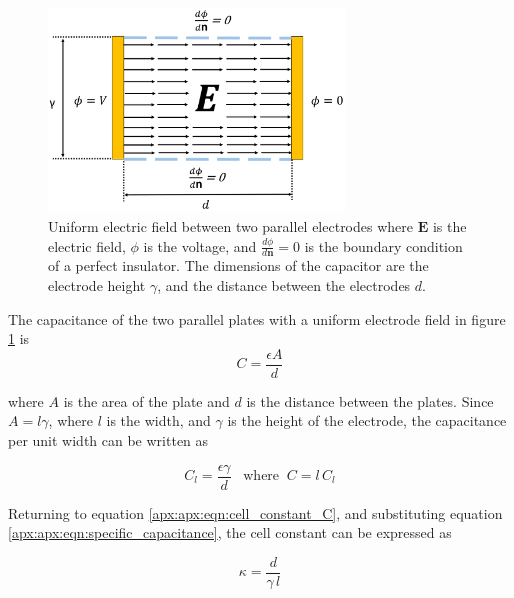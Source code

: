    \begin{figure}[ht]
  \centering
  \includegraphics[width=0.7\textwidth]{images/capacitorNoFringe.png}
  \caption[Uniform electric field between parallel plates]{Uniform electric field between two parallel electrodes where $\boldsymbol{E}$ is the electric field, $\phi$ is the voltage, and $\frac{d\phi}{d\boldsymbol{n}}=0$ is the boundary condition of a perfect insulator. The dimensions of the capacitor are the electrode height $\gamma$, and the distance between the electrodes $d$.}
  \label{apx:apx:fig:parallel_capacitor}
  \end{figure}
  
  \par The capacitance of the two parallel plates with a uniform electrode field in figure \ref{apx:apx:fig:parallel_capacitor} is
  \begin{equation}
      C = \frac{\epsilon A}{d}
      \label{apx:apx:eqn:capacitor}
  \end{equation}
  
  \noindent where $A$ is the area of the plate and $d$ is the distance between the plates. Since $A = l\gamma$, where $l$ is the width, and $\gamma$ is the height of the electrode, the capacitance per unit width can be written as
  
  \begin{equation}
      C_l = \frac{\epsilon\gamma}{d} \;\;\;\text{where} \;\; C =l\, C_l
      \label{apx:apx:eqn:specific_capacitance}
  \end{equation}
  
  \par Returning to equation \ref{apx:apx:eqn:cell_constant_C}, and substituting equation \ref{apx:apx:eqn:specific_capacitance}, the cell constant can be expressed as 
  
  \begin{equation}
      \kappa = \frac{d}{\gamma \, l}
      \label{apx:apx:eqn:cell_constant}
  \end{equation}
  
